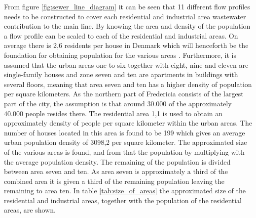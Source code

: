 From figure \ref{fig:sewer_line_diagram} it can be seen that 11 different flow profiles needs to be constructed to cover each residential and industrial area wastewater contribution to the main line. %
By knowing the area and density of the population a flow profile can be scaled to each of the residential and industrial areas. 
On average there is 2,6 residents per house in Denmark which will henceforth be the foundation for obtaining population for the various areas \cite{nykredit}. 
Furthermore, it is assumed that the urban areas one to six together with eight, nine and eleven are single-family houses and zone seven and ten are apartments in buildings with several floors, meaning that area seven and ten has a higher density of population per square kilometers.
As the northern part of Fredericia consists of the largest part of the city, the assumption is that around 30.000 of the approximately 40.000 people resides there. 
The residential area 1,1 is used to obtain an approximately density of people per square kilometer within the urban areas. The number of houses located in this area is found to be 199 which gives an average urban population density of 3098,2 per square kilometer.
The approximated size of the various areas is found, and from that the population by multiplying with the average population density. The remaining of the population is divided between area seven and ten. As area seven is approximately a third of the combined area it is given a third of the remaining population leaving the remaining to area ten.
In table \ref{tab:size_of_areas} the approximated size of the residential and industrial areas, together with the population of the residential areas, are shown. 

